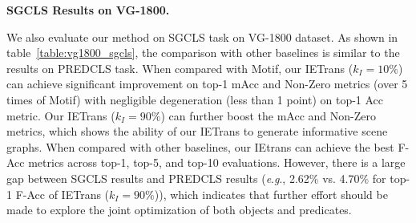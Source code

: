 \documentclass[runningheads]{llncs}
\newcommand{\eg}{\textit{e}.\textit{g}.}
\begin{document}
\smallskip
\noindent
\textbf{SGCLS Results on VG-1800.}
\begin{table*}
    \caption{SGCLS triplet-level evaluation results on VG-1800 dataset.}
    \begin{center}
    \small
    \end{center}
    \label{table:vg1800_sgcls}
\end{table*}
We also evaluate our method on SGCLS task on VG-1800 dataset.
As shown in table~\ref{table:vg1800_sgcls}, the comparison with other baselines is similar to the results on PREDCLS task.
When compared with Motif, our IETrans ($k_I=10\%$) can achieve significant improvement on top-1 mAcc and Non-Zero metrics (over 5 times of Motif) with negligible degeneration (less than 1 point) on top-1 Acc metric.
Our IETrans ($k_I=90\%$) can further boost the mAcc and Non-Zero metrics, which shows the ability of our IETrans to generate informative scene graphs.
When compared with other baselines, our IEtrans can achieve the best F-Acc metrics across top-1, top-5, and top-10 evaluations.
However, there is a large gap between SGCLS results and PREDCLS results (\eg, 2.62\% vs. 4.70\% for top-1 F-Acc of IETrans ($k_I=90\%$)), which indicates that further effort should be made to explore the joint optimization of both objects and predicates.
\end{document}
